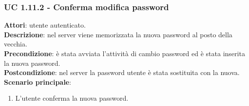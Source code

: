 	\subsubsection{UC 1.11.2 - Conferma modifica password}{
		\label{uc1.11.2}
		\textbf{Attori}: utente autenticato.\\
		\textbf{Descrizione}: nel server viene memorizzata la nuova password al posto della vecchia. \\
		\textbf{Precondizione}: è stata avviata l'attività di cambio password ed è stata inserita la nuova password.	\\
		\textbf{Postcondizione}: nel server la password utente è stata sostituita con la nuova.	\\
		\textbf{Scenario principale}:
		\begin{enumerate}
			\item L'utente conferma la nuova password.
		\end{enumerate}		
		}